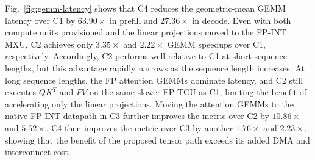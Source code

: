 \documentclass[sigconf,anonymous,nonacm]{acmart}
\newcommand{\fpint}{FP-INT}
\begin{document}

Fig.~\ref{fig:gemm-latency} shows that C4 reduces the geometric-mean GEMM latency over C1 by $63.90\times$ in prefill and $27.36\times$ in decode. 
Even with both compute units provisioned and the linear projections moved to the \fpint{} MXU, C2 achieves only $3.35\times$ and $2.22\times$ GEMM speedups over C1, respectively.
Accordingly, C2 performs well relative to C1 at short sequence lengths, but this advantage rapidly narrows as the sequence length increases.
At long sequence lengths, the FP attention GEMMs dominate latency, and C2 still executes $QK^T$ and $PV$ on the same slower FP TCU as C1, limiting the benefit of accelerating only the linear projections.
Moving the attention GEMMs to the native \fpint{} datapath in C3 further improves the metric over C2 by $10.86\times$ and $5.52\times$. C4 then improves the metric over C3 by another $1.76\times$ and $2.23\times$, showing that the benefit of the proposed tensor path exceeds its added DMA and interconnect cost.

\end{document}
